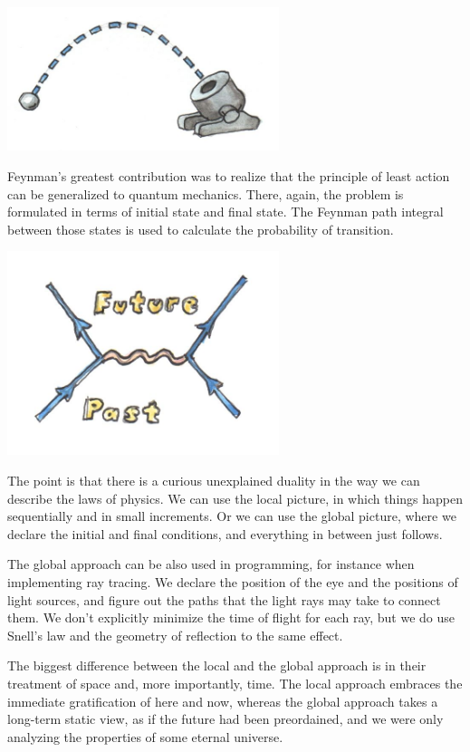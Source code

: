 \includegraphics[width=3.12500in]{images/mortar.jpg}

Feynman's greatest contribution was to realize that the principle of
least action can be generalized to quantum mechanics. There, again, the
problem is formulated in terms of initial state and final state. The
Feynman path integral between those states is used to calculate the
probability of transition.

\includegraphics[width=3.12500in]{images/feynman.jpg}

The point is that there is a curious unexplained duality in the way we
can describe the laws of physics. We can use the local picture, in which
things happen sequentially and in small increments. Or we can use the
global picture, where we declare the initial and final conditions, and
everything in between just follows.

The global approach can be also used in programming, for instance when
implementing ray tracing. We declare the position of the eye and the
positions of light sources, and figure out the paths that the light rays
may take to connect them. We don't explicitly minimize the time of
flight for each ray, but we do use Snell's law and the geometry of
reflection to the same effect.

The biggest difference between the local and the global approach is in
their treatment of space and, more importantly, time. The local approach
embraces the immediate gratification of here and now, whereas the global
approach takes a long-term static view, as if the future had been
preordained, and we were only analyzing the properties of some eternal
universe.

